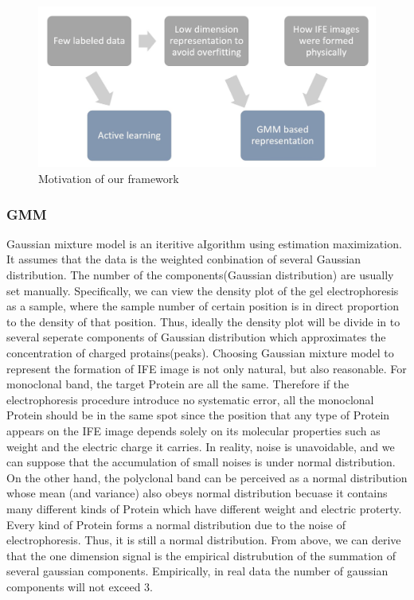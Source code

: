 \documentclass[10pt,twocolumn,letterpaper]{article}
\begin{document}
\begin{figure}[t]
    \begin{center}
       \includegraphics[width=0.8\linewidth]{motivation.jpg}
    \end{center}
       \caption{Motivation of our framework}
    \end{figure}

\subsubsection{GMM}
Gaussian mixture model is an iteritive aIgorithm using estimation maximization. It assumes that the data is the weighted conbination of several Gaussian distribution. The number of the components(Gaussian distribution) are usually set manually. Specifically, we can view the density plot of the gel electrophoresis as a sample, where the sample number of certain position is in direct proportion to the density of that position. Thus, ideally the density plot will be divide in to several seperate components of Gaussian distribution which approximates the concentration of charged protains(peaks). Choosing Gaussian mixture model to represent the formation of IFE image is not only natural, but also reasonable. For monoclonal band, the target Protein are all the same. Therefore if the electrophoresis procedure introduce no systematic error, all the monoclonal Protein should be in the same spot since the position that any type of Protein appears on the IFE image depends solely on its molecular properties such as weight and the electric charge it carries. In reality, noise is unavoidable, and we can suppose that the accumulation of small noises is under normal distribution. On the other hand, the polyclonal band can be perceived as a normal distribution whose mean (and variance) also obeys normal distribution becuase it contains many different kinds of Protein which have different weight and electric proterty. Every kind of Protein forms a normal distribution due to the noise of electrophoresis. Thus, it is still a normal distribution.%
From above, we can derive that the one dimension signal is the empirical distrubution of the summation of several gaussian components. Empirically, in real data the number of gaussian components will not exceed 3.
\end{document}
